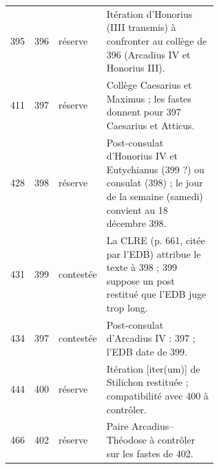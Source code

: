 \begin{longtable}{@{}r r l p{0.6\linewidth}@{}}
395 & 396 & réserve & {\footnotesize Itération d’Honorius (IIII transmis) à confronter au collège de 396 (Arcadius IV et Honorius III).} \\
411 & 397 & réserve & {\footnotesize Collège Caesarius et Maximus ; les fastes donnent pour 397 Caesarius et Atticus.} \\
428 & 398 & réserve & {\footnotesize Post-consulat d’Honorius IV et Eutychianus (399 ?) ou consulat (398) ; le jour de la semaine (samedi) convient au 18 décembre 398.} \\
431 & 399 & contestée & {\footnotesize La CLRE (p. 661, citée par l’EDB) attribue le texte à 398 ; 399 suppose un post restitué que l’EDB juge trop long.} \\
434 & 397 & contestée & {\footnotesize Post-consulat d’Arcadius IV : 397 ; l’EDB date de 399.} \\
444 & 400 & réserve & {\footnotesize Itération [iter(um)] de Stilichon restituée ; compatibilité avec 400 à contrôler.} \\
466 & 402 & réserve & {\footnotesize Paire Arcadius–Théodose à contrôler sur les fastes de 402.} \\
\end{longtable}

